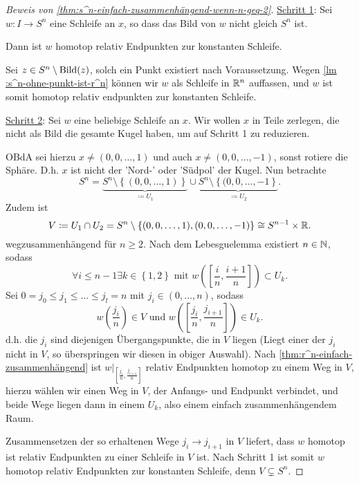 \begin{proof}[Beweis von \autoref{thm:s^n-einfach-zusammenhängend-wenn-n-geq-2}]
    \underline{Schritt 1}: Sei  $w\colon I \to  S^n$ eine Schleife an $x$, so dass das Bild von  $w$ nicht gleich  $S^n$ ist.
    \begin{claim}
        Dann ist $w$ homotop relativ Endpunkten zur konstanten Schleife.
    \end{claim}
    \begin{subproof}
        Sei $z\in S^n \setminus \operatorname{Bild}(z)$, solch ein Punkt existiert nach Voraussetzung. Wegen \autoref{lm :s^n-ohne-punkt-ist-r^n}  können wir $w$ als Schleife in  $\mathbb{R}^n$ auffassen, und $w$ ist somit homotop relativ endpunkten zur konstanten Schleife.
    \end{subproof}
    \underline{Schritt 2}: Sei $w$ eine beliebige Schleife an $x$. Wir wollen $x$ in Teile zerlegen, die nicht als Bild die gesamte Kugel haben, um auf Schritt 1 zu reduzieren.

    OBdA sei hierzu  $x\neq (0,0,\ldots,1)$ und auch $x\neq  (0,0,\ldots,-1)$, sonst rotiere die Sphäre. D.h. $x$ ist nicht der 'Nord-' oder 'Südpol' der Kugel. Nun betrachte
     \[
         S^n = \underbrace{S^n \setminus \left \{(0,0,\ldots,1)\right\}}_{\coloneqq  U_1} \cup \underbrace{S^n \setminus \left \{(0,0,\ldots,-1\right\}}_{\coloneqq  U_2} 
    .\] 
    Zudem ist
    \[
    V \coloneqq  U_1 \cap U_2 = S^n \setminus \left \{(0,0,\ldots,1) , (0,0,\ldots,-1)\right\}  \cong S^{n-1}\times \mathbb{R}
    .\] 
    wegzusammenhängend für $n\geq 2$. Nach dem Lebesguelemma existiert $n\in \mathbb{N}$, sodass
    \[
        \forall i\leq n-1 \exists k\in \left \{1,2\right\} \text{ mit } w\left( \left[ \frac{i}{n},\frac{i+1}{n} \right]  \right) \subset U_k
    .\] 
    Sei $0 = j_0 \leq  j_1 \leq  \ldots \leq j_l = n$ mit $j_i \in (0,\ldots,n)$, sodass
    \[
        w\left( \frac{j_i}{n} \right) \in V \text{ und } w\left( \left[ \frac{j_i}{n}, \frac{j_{i+1}}{n} \right]  \right) \in  U_k
    .\] 
    d.h. die $j_i$ sind diejenigen Übergangspunkte, die in  $V$ liegen (Liegt einer der $j_i$ nicht in  $V$, so überspringen wir diesen in obiger Auswahl). Nach  \autoref{thm:r^n-einfach-zusammenhängend} ist $w|_{\left[ \frac{j_i}{n}, \frac{j_{i+1}}{n} \right] }$ relativ Endpunkten homotop zu einem Weg in $V$, hierzu wählen wir einen Weg in  $V$, der Anfangs- und Endpunkt verbindet, und beide Wege liegen dann in einem $U_k$, also einem einfach zusammenhängendem Raum.

    Zusammensetzen der so erhaltenen Wege $j_i \to  j_{i+1}$ in $V$ liefert, dass $w$ homotop ist relativ Endpunkten zu einer Schleife in  $V$ ist. Nach Schritt 1 ist somit $w$ homotop relativ Endpunkten zur konstanten Schleife, denn  $V \subsetneq S^n$.
\end{proof}

